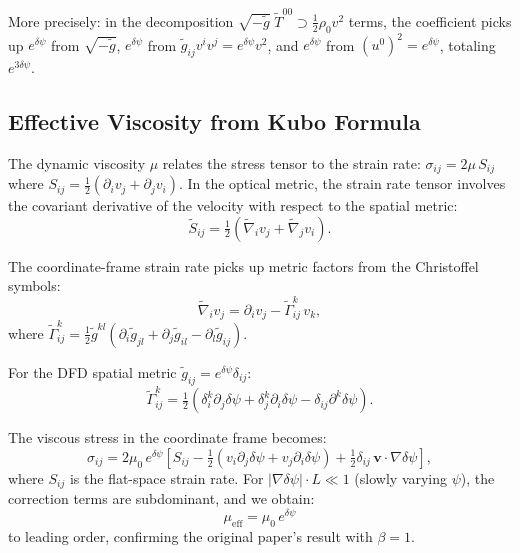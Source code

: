 \documentclass[12pt,twocolumn]{article}
\newcommand{\Reff}{\mathrm{eff}}
\newcommand{\vvec}{\mathbf{v}}
\newcommand{\dpsi}{\delta\psi}
\newcommand{\half}{\tfrac{1}{2}}
\begin{document}
More precisely: in the decomposition $\sqrt{-\tilde{g}}\;\tilde{T}^{00}
\supset \half\rho_0 v^2$ terms, the coefficient picks up
$e^{\dpsi}$ from $\sqrt{-\tilde{g}}$, $e^{\dpsi}$ from $\tilde{g}_{ij}
v^iv^j = e^{\dpsi}v^2$, and $e^{\dpsi}$ from $(u^0)^2 = e^{\dpsi}$,
totaling $e^{3\dpsi}$.

\subsection{Effective Viscosity from Kubo Formula}
\label{sec:mu_eff}

The dynamic viscosity $\mu$ relates the stress tensor to the strain rate:
$\sigma_{ij} = 2\mu\,S_{ij}$ where $S_{ij} = \half(\partial_i v_j +
\partial_j v_i)$. In the optical metric, the strain rate tensor involves
the covariant derivative of the velocity with respect to the spatial
metric:
\begin{equation}
\tilde{S}_{ij} = \half(\tilde{\nabla}_i v_j + \tilde{\nabla}_j v_i).
\end{equation}

The coordinate-frame strain rate picks up metric factors from the Christoffel
symbols:
\begin{equation}
\tilde{\nabla}_i v_j = \partial_i v_j - \tilde{\Gamma}^k_{ij}\,v_k,
\end{equation}
where $\tilde{\Gamma}^k_{ij} = \half\tilde{g}^{kl}(\partial_i\tilde{g}_{jl}
+ \partial_j\tilde{g}_{il} - \partial_l\tilde{g}_{ij})$.

For the DFD spatial metric $\tilde{g}_{ij} = e^{\dpsi}\delta_{ij}$:
\begin{equation}
\tilde{\Gamma}^k_{ij} = \half(\delta^k_i\partial_j\dpsi
+ \delta^k_j\partial_i\dpsi - \delta_{ij}\partial^k\dpsi).
\end{equation}

The viscous stress in the coordinate frame becomes:
\begin{equation}
\sigma_{ij} = 2\mu_0\,e^{\dpsi}\left[S_{ij}
- \half(v_i\partial_j\dpsi + v_j\partial_i\dpsi)
+ \half\delta_{ij}\,\vvec\cdot\nabla\dpsi\right],
\end{equation}
where $S_{ij}$ is the flat-space strain rate. For $|\nabla\dpsi|\cdot L \ll 1$
(slowly varying $\psi$), the correction terms are subdominant, and we
obtain:
\begin{equation}
\boxed{\mu_\Reff = \mu_0\,e^{\dpsi}}
\label{eq:mu_eff_final}
\end{equation}
to leading order, confirming the original paper's result with $\beta = 1$.
\end{document}

